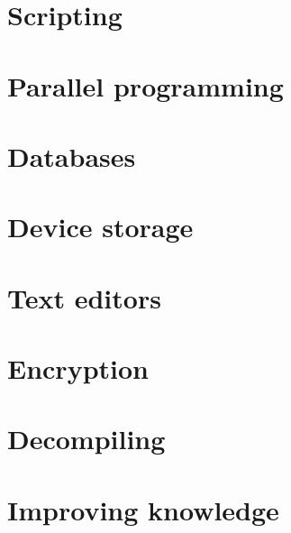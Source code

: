 \documentclass[oneside]{book}
\begin{document}
\part{Scripting}





\part{Parallel programming}


\part{Databases}








\part{Device storage}

\part{Text editors}



\part{Encryption}



\part{Decompiling}



\part{Improving knowledge}


\end{document}
